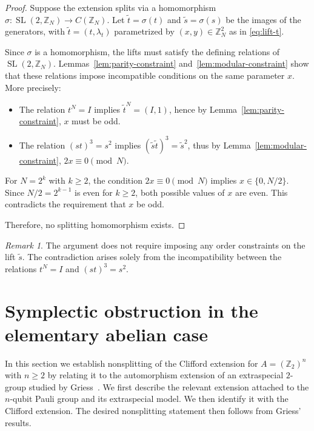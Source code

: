 \documentclass[11pt, reqno]{amsart}
\theoremstyle{definition}
\theoremstyle{remark}
\newtheorem{remark}[theorem]{Remark}
\newcommand{\Z}{\mathbb{Z}}
\DeclareMathOperator{\SL}{SL}
\begin{document}
\begin{proof}
Suppose the extension splits via a homomorphism $\sigma: \SL(2,\Z_N) \to C(\Z_N)$. Let $\tilde{t} = \sigma(t)$ and $\tilde{s} = \sigma(s)$ be the images of the generators, with $\tilde{t} = (t, \lambda_t)$ parametrized by $(x,y) \in \Z_N^2$ as in \eqref{eq:lift-t}.

Since $\sigma$ is a homomorphism, the lifts must satisfy the defining relations of $\SL(2, \Z_N)$. Lemmas~\ref{lem:parity-constraint} and~\ref{lem:modular-constraint} show that these relations impose incompatible conditions on the same parameter $x$. More precisely:
\begin{itemize}
\item The relation $t^N = I$ implies $\tilde{t}^N = (I, 1)$, hence by Lemma~\ref{lem:parity-constraint}, $x$ must be odd.
\item The relation $(st)^3 = s^2$ implies $(\tilde{s}\tilde{t})^3 = \tilde{s}^2$, thus by Lemma~\ref{lem:modular-constraint}, $2x \equiv 0 \pmod{N}$.
\end{itemize}

For $N = 2^k$ with $k \geq 2$, the condition $2x \equiv 0 \pmod{N}$ implies $x \in \{0, N/2\}$. Since $N/2 = 2^{k-1}$ is even for $k \geq 2$, both possible values of $x$ are even. This contradicts the requirement that $x$ be odd.

Therefore, no splitting homomorphism exists.
\end{proof}

\begin{remark}
The argument does not require imposing any order constraints on the lift $\tilde{s}$. The contradiction arises solely from the incompatibility between the relations $t^N = I$ and $(st)^3 = s^2$.
\end{remark}
\section{Symplectic obstruction in the elementary abelian case}\label{sec:symplectic-obstruction}

In this section we establish nonsplitting of the Clifford extension for $A = (\Z_2)^n$ with $n \geq 2$ by relating it to the automorphism extension of an extraspecial $2$-group studied by Griess~\cite{Griess1973}. We first describe the relevant extension attached to the $n$-qubit Pauli group and its extraspecial model. We then identify it with the Clifford extension. The desired nonsplitting statement then follows from Griess' results.
\end{document}

